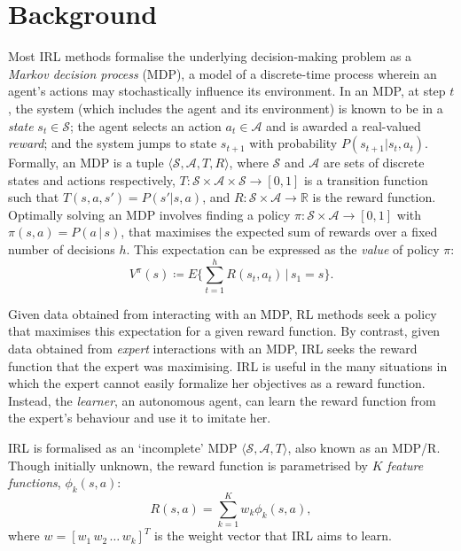\documentclass{aamas2016}
\begin{document}
\section{Background}
Most IRL methods formalise the underlying decision-making problem as a \emph{Markov decision process} (MDP), a model of a discrete-time process wherein an agent's actions may stochastically influence its environment. In an MDP, at step $t$, the system (which includes the agent and its environment) is known to be in a \emph{state} $s_t\in\mathcal{S}$; the agent selects an action $a_t\in\mathcal{A}$ and is awarded a real-valued \emph{reward}; and the system jumps to state $s_{t+1}$ with probability $P(s_{t+1}|s_t,a_t)$. Formally, an MDP is a tuple $\langle\mathcal{S},\mathcal{A},T,R\rangle$, where $\mathcal{S}$ and $\mathcal{A}$ are sets of discrete states and actions respectively, $T:\mathcal{S}\times\mathcal{A}\times\mathcal{S}\rightarrow [0,1]$ is a transition function such that $T(s,a,s')=P(s'|s,a)$, and $R:\mathcal{S}\times\mathcal{A}\rightarrow\mathbb R$ is the reward function. 
Optimally solving an MDP involves finding a policy $\pi:\mathcal{S}\times\mathcal{A}\rightarrow[0,1]$ with $\pi(s,a) = P(a\,|\,s)$, that maximises the expected sum of rewards over a fixed number of decisions $h$. This expectation can be expressed as the \emph{value} of policy $\pi$:
\begin{equation}
\label{eq:value}
 V^\pi(s) \coloneqq E\{\sum_{t = 1}^hR(s_t,a_t)\,\vert\, s_1 = s\}.
\end{equation}

Given data obtained from interacting with an MDP, RL methods seek a policy that maximises this expectation for a given reward function.  By contrast, given data obtained from \emph{expert} interactions with an MDP, IRL seeks the reward function that the expert was maximising.  IRL is useful in the many situations in which the expert cannot easily formalize her objectives as a reward function.  Instead, the \emph{learner}, an autonomous agent, can learn the reward function from the expert's behaviour and use it to imitate her.

IRL is formalised as an `incomplete' MDP $\langle\mathcal{S},\mathcal{A},T\rangle$, also known as an MDP/R. Though initially unknown, the reward function is parametrised by $K$ \emph{feature functions}, $\phi_k(s,a)$:
\begin{equation}
R(s,a) = \sum_{k=1}^Kw_k\phi_k(s,a), \label{eq:rew}
\end{equation}
where $w=[w_1\,w_2\,\ldots\,w_k]^T$ is the weight vector that IRL aims to learn.
\end{document}
